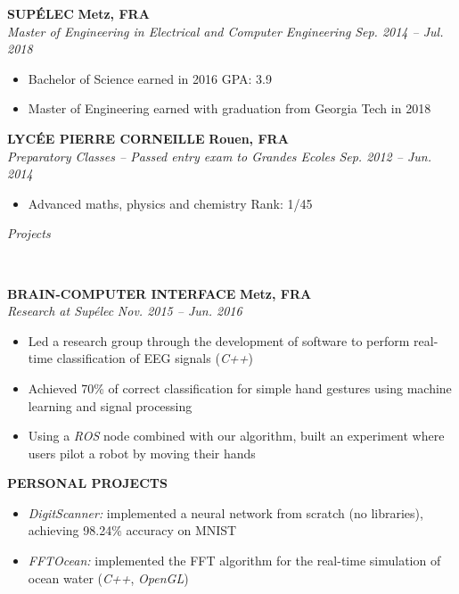 \documentclass[a4paper, 12pt]{article}
\newcommand{\marginline}{-0.3cm}
\newcommand{\margincontent}{-0.6cm}
\newcommand{\marginbeforesection}{0.35cm}
\newcommand{\linewidthperso}{0.02cm}
\newcommand{\styletitle}[1]{\textbf{#1}}
\newcommand{\styledesc}[1]{\textit{#1}}
\newcommand{\styleloc}[1]{\textbf{#1}}
\newcommand{\styledates}[1]{\textit{#1}}
\newcommand{\stylesection}[1]{
  \vspace{\marginbeforesection}
  \begin{normalsize}\textit{#1}\end{normalsize}
  \vspace{\marginline}\\
  \noindent\makebox[\linewidth]{\rule{\textwidth}{\linewidthperso}}

}
\begin{document}
\begin{footnotesize}
\styletitle{SUP\'ELEC} \hfill \styleloc{Metz, FRA}\\
\styledesc{Master of Engineering in Electrical and Computer Engineering} \hfill \styledates{Sep. 2014 -- Jul. 2018}\\
\vspace{\margincontent}
\begin{itemize}
  \item Bachelor of Science earned in 2016 \hfill GPA: 3.9
  \item Master of Engineering earned with graduation from Georgia Tech in 2018
\end{itemize}

\styletitle{LYC\'EE PIERRE CORNEILLE} \hfill \styleloc{Rouen, FRA}\\
\styledesc{Preparatory Classes -- Passed entry exam to Grandes Ecoles} \hfill \styledates{Sep. 2012 -- Jun. 2014}\\
\vspace{\margincontent}
\begin{itemize}
  \item Advanced maths, physics and chemistry \hfill Rank: 1/45
\end{itemize}

\stylesection{Projects}

\styletitle{BRAIN-COMPUTER INTERFACE} \hfill \styleloc{Metz, FRA}\\
\styledesc{Research at Sup\'elec} \hfill \styledates{Nov. 2015 -- Jun. 2016}\\
\vspace{\margincontent}
\begin{itemize}
  \item Led a research group through the development of software to perform real-time classification of EEG signals (\textit{C++})
  \item Achieved 70\% of correct classification for simple hand gestures using machine learning and signal processing
  \item Using a \textit{ROS} node combined with our algorithm, built an experiment where users pilot a robot by moving their hands
\end{itemize}

\styletitle{PERSONAL PROJECTS}\\
\vspace{\margincontent}
\begin{itemize}
  \item \textit{DigitScanner:} implemented a neural network from scratch (no libraries), achieving 98.24\% accuracy on MNIST
  \item \textit{FFTOcean:} implemented the FFT algorithm for the real-time simulation of ocean water (\textit{C++}, \textit{OpenGL})
\end{itemize}


\end{footnotesize}
\end{document}
